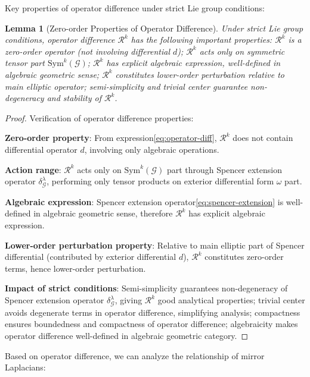 \documentclass[a4paper,12pt]{extarticle}
\newtheorem{lemma}[theorem]{Lemma}
\theoremstyle{definition}
\begin{document}
Key properties of operator difference under strict Lie group conditions:

\begin{lemma}[Zero-order Properties of Operator Difference]
Under strict Lie group conditions, operator difference $\mathcal{R}^k$ has the following important properties: $\mathcal{R}^k$ is a zero-order operator (not involving differential $d$); $\mathcal{R}^k$ acts only on symmetric tensor part $\mathrm{Sym}^k(\mathcal{G})$; $\mathcal{R}^k$ has explicit algebraic expression, well-defined in algebraic geometric sense; $\mathcal{R}^k$ constitutes lower-order perturbation relative to main elliptic operator; semi-simplicity and trivial center guarantee non-degeneracy and stability of $\mathcal{R}^k$.
\end{lemma}

\begin{proof}
Verification of operator difference properties:

\textbf{Zero-order property}: From expression\eqref{eq:operator-diff}, $\mathcal{R}^k$ does not contain differential operator $d$, involving only algebraic operations.

\textbf{Action range}: $\mathcal{R}^k$ acts only on $\mathrm{Sym}^k(\mathcal{G})$ part through Spencer extension operator $\delta^{\lambda}_{\mathcal{G}}$, performing only tensor products on exterior differential form $\omega$ part.

\textbf{Algebraic expression}: Spencer extension operator\eqref{eq:spencer-extension} is well-defined in algebraic geometric sense, therefore $\mathcal{R}^k$ has explicit algebraic expression.

\textbf{Lower-order perturbation property}: Relative to main elliptic part of Spencer differential (contributed by exterior differential $d$), $\mathcal{R}^k$ constitutes zero-order terms, hence lower-order perturbation.

\textbf{Impact of strict conditions}: Semi-simplicity guarantees non-degeneracy of Spencer extension operator $\delta^{\lambda}_{\mathcal{G}}$, giving $\mathcal{R}^k$ good analytical properties; trivial center avoids degenerate terms in operator difference, simplifying analysis; compactness ensures boundedness and compactness of operator difference; algebraicity makes operator difference well-defined in algebraic geometric category.
\end{proof}

Based on operator difference, we can analyze the relationship of mirror Laplacians:
\end{document}

